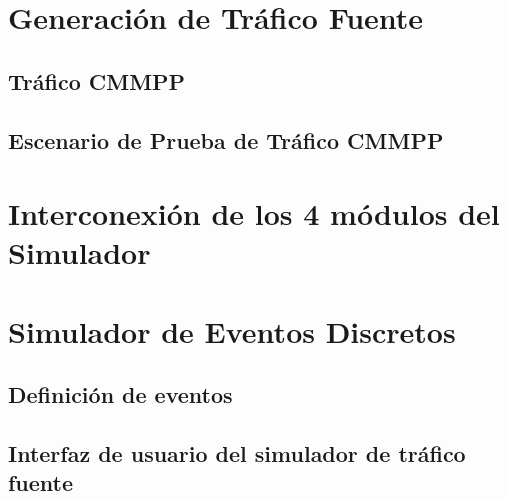 \hfill

\break


\section{Generación de Tráfico Fuente}

\subsection{Tráfico CMMPP}
\subsection{Escenario de Prueba de Tráfico CMMPP}


\hfill

\break


\section{Interconexión de los 4 módulos del Simulador}


\hfill

\break


\section{Simulador de Eventos Discretos}

\subsection{Definición de eventos}

\subsection{Interfaz de usuario del simulador de tráfico fuente}

